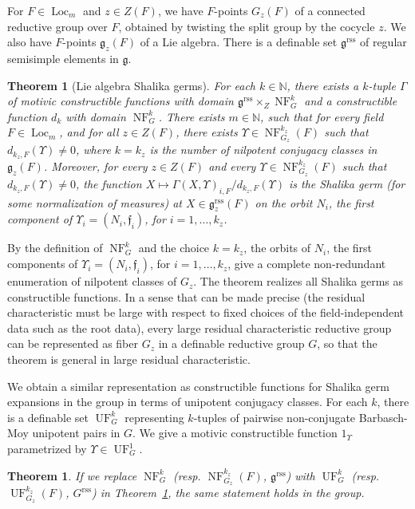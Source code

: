 \documentclass[12pt]{amsart}
\newcommand{\op}[1]{\operatorname{#1}}
\newcommand{\ring}[1]{{\mathbb #1}}
\def\NF{\op{NF}}
\def\UF{\op{UF}}
\def\Y{\Upsilon}
\def\s{{\mathfrak{f}}}
\newcommand{\fg}{\mathfrak{g}}
\newcommand{\reg}{\mathrm{rss}}
\theoremstyle{plain}
\newtheorem{theorem}[thm]{Theorem}
\theoremstyle{definition}
\begin{document}
For $F\in \op{Loc}_m$ and $z\in Z(F)$, we have $F$-points $G_z(F)$ of
a connected reductive group over $F$, obtained by twisting the split
group by the cocycle $z$. We also have $F$-points $\fg_z(F)$ of a Lie
algebra. There is a definable set $\fg^\reg$ of regular semisimple
elements in $\fg$.




\begin{theorem} [Lie algebra Shalika germs]\label{thm:lie-shalika} 
  For each $k\in \ring{N}$, there exists a $k$-tuple $\Gamma$ of
  motivic constructible functions with domain $\fg^\reg\times_Z
  \NF^k_G$ and a constructible function $d_k$ with domain $\NF^k_G$.
  There exists $m\in \ring{N}$, such that for every field $F\in
  \op{Loc}_{m}$, and for all $z\in Z(F)$, there exists $\Y\in
  \NF^{k_z}_{G_z}(F)$ such that $d_{k_z,F}(\Y)\ne 0$, where $k = k_z$
  is the number of nilpotent conjugacy classes in $\fg_z(F)$.
  Moreover, for every $z\in Z(F)$ and every $\Y\in \NF^{k_z}_{G_z}(F)$
  such that $d_{k_z,F}(\Y)\ne 0$, the function $X\mapsto
  \Gamma(X,\Y)_{i,F}/d_{k_z,F}(\Y)$ is the Shalika germ (for some
  normalization of measures) at $X\in \fg^\reg_z(F)$ on the orbit
  $N_i$, the first component of $\Y_i=(N_i,\s_i)$, for $i=1,\ldots,k_z$.
\end{theorem}

By the definition of $\NF^k_{G}$ and the choice $k=k_z$, the orbits of
$N_i$, the first components of
$\Y_i=(N_i,\s_i)$, for $i=1,\ldots,k_z$, give a complete non-redundant
enumeration of nilpotent classes of $G_z$.  The theorem realizes all
Shalika germs as constructible functions.  In a sense that can be made
precise (the residual characteristic must be large with respect to
fixed choices of the field-independent data such as the root data),
every large residual characteristic reductive group can be represented
as fiber $G_z$ in a definable reductive group $G$, so that the
theorem is general in large residual characteristic.

We obtain a similar representation as constructible functions for
Shalika germ expansions in the group in terms of unipotent conjugacy
classes.  For each $k$, there is a definable set $\UF^k_G$
representing $k$-tuples of pairwise non-conjugate Barbasch-Moy
unipotent pairs in $G$.  We give a motivic constructible function
$1_\Y$ parametrized by $\Y\in \UF^1_G$.

\begin{theorem} If we replace $\NF^k_G$ (resp. $\NF^{k_z}_{G_z}(F)$,
  $\fg^\reg$) with $\UF^k_{G}$ (resp. $\UF^{k_z}_{G_z}(F)$, $G^\reg$)
  in Theorem~\ref{thm:lie-shalika}, the same statement holds in the
  group.
\end{theorem}
\end{document}
